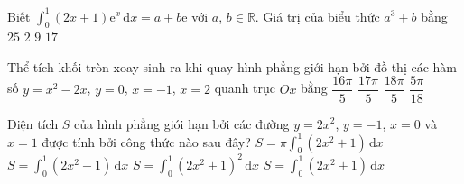 \begin{ex}%
Biết $\displaystyle\int_0^1(2 x+1) \mathrm{e}^x \mathrm{\,d}x=a+ b\mathrm{e}$ với $a$, $b\in \mathbb{R}$. Giá trị của biểu thức $a^3+b$ bằng
\choice
{$25$}
{\True $2$}
{$9$}
{$17$}
\end{ex}

\begin{ex}%
Thể tích khối tròn xoay sinh ra khi quay hình phẳng giới hạn bởi đồ thị các hàm số $y=x^2-2x$, $y=0$, $x=-1$, $x=2$ quanh trục $Ox$ bằng
\choice
{$\dfrac{16\pi}{5}$}
{$\dfrac{17\pi}{5}$}
{\True $\dfrac{18\pi}{5}$}
{$\dfrac{5\pi}{18}$}
\end{ex}

\begin{ex}%
Diện tích $S$ của hình phẳng giói hạn bởi các đường $y=2x^2$, $y=-1$, $x=0$ và $x=1$ được tính bởi công thức nào sau đây?
\choice
{$S=\pi\displaystyle\int_0^1(2x^2+1) \mathrm{\,d}x$}
{$S=\displaystyle\int_0^1(2x^2-1) \mathrm{\,d}x$}
{$S=\displaystyle\int_0^1(2x^2+1)^2 \mathrm{\,d}x$}
{\True $S=\displaystyle\int_0^1(2x^2+1) \mathrm{\,d}x$}
\end{ex}

